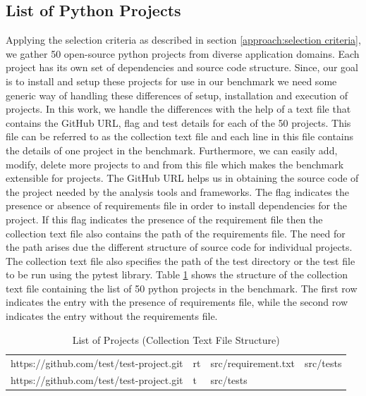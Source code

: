 \subsection{List of Python Projects}
\label{approach:list of projects}
Applying the selection criteria as described in section \ref{approach:selection criteria}, we gather 50 open-source python projects from diverse application domains. Each project has its own set of dependencies and source code structure.
Since, our goal is to install and setup these projects for use in our benchmark we need some generic way of handling these differences of setup, installation and execution of projects. 
In this work, we handle the differences with the help of a text file that contains the GitHub URL, flag and test details for each of the 50 projects. This file can be referred to as the collection text file and each line in this file contains the details of one project in the benchmark. Furthermore, we can easily add, modify, delete more projects to and from this file which makes the benchmark extensible for projects.
The GitHub URL helps us in obtaining the source code of the project needed by the analysis tools and frameworks. 
The flag indicates the presence or absence of requirements file in order to install dependencies for the project. If this flag indicates the presence of the requirement file then the collection text file also contains the path of the requirements file. The need for the path arises due the different structure of source code for individual projects.
 The collection text file also specifies the path of the test directory or the test file to be run using the pytest library.
 Table \ref{table:list of projects} shows the structure of the collection text file containing the list of 50 python projects in the benchmark.
 The first row indicates the entry with the presence of requirements file, while the second row indicates the entry without the requirements file.

\begin{table}[ht]
    \centering
    \begin{tabular}{llll}
    \hline
    https://github.com/test/test-project.git    & rt    & src/requirement.txt   & src/tests\\
    https://github.com/test/test-project.git    & t    & src/tests\\
    \hline
    \end{tabular}
    \caption{List of Projects (Collection Text File Structure)}
    \label{table:list of projects}
\end{table}

